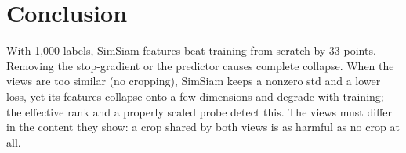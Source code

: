 \documentclass[10pt,twocolumn,letterpaper]{article}
\begin{document}
\section{Conclusion}
\label{sec:conclusion}
With 1,000 labels, SimSiam features beat training from scratch by 33 points.
Removing the stop-gradient or the predictor causes complete collapse.
When the views are too similar (no cropping), SimSiam keeps a nonzero std and a lower loss, yet its features collapse onto a few dimensions and degrade with training; the effective rank and a properly scaled probe detect this.
The views must differ in the content they show: a crop shared by both views is as harmful as no crop at all.

{
    \small
    
    
}
\end{document}
